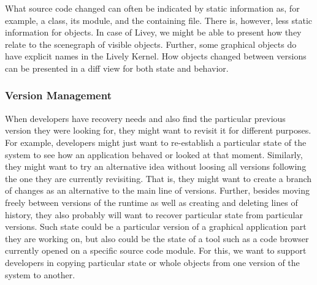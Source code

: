 What source code changed can often be indicated by static information as, for example, a class, its module, and the containing file.
There is, however, less static information for objects.
In case of Livey, we might be able to present how they relate to the scenegraph of visible objects.
Further, some graphical objects do have explicit names in the Lively Kernel.
How objects changed between versions can be presented in a diff view for both state and behavior.

\subsubsection{Version Management}

When developers have recovery needs and also find the particular previous version they were looking for, they might want to revisit it for different purposes.
For example, developers might just want to re-establish a particular state of the system to see how an application behaved or looked at that moment.
Similarly, they might want to try an alternative idea without loosing all versions following the one they are currently revisiting.
That is, they might want to create a branch of changes as an alternative to the main line of versions.
Further, besides moving freely between versions of the runtime as well as creating and deleting lines of history, they also probably will want to recover particular state from particular versions.
Such state could be a particular version of a graphical application part they are working on, but also could be the state of a tool such as a code browser currently opened on a specific source code module.
For this, we want to support developers in copying particular state or whole objects from one version of the system to another.

